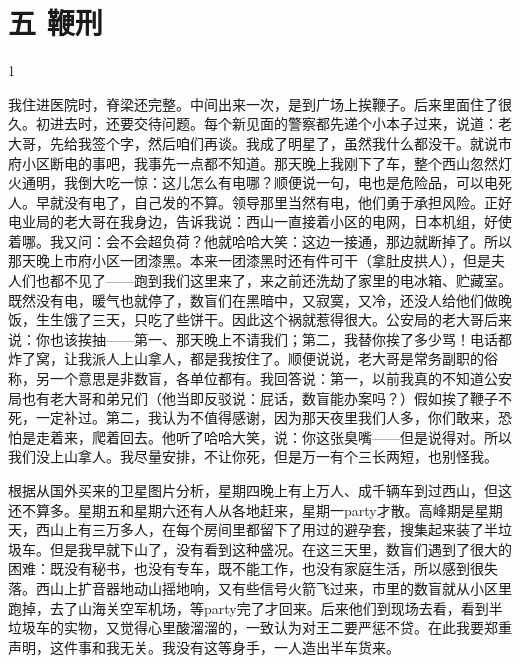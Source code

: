 \section{五 鞭刑}

1 

我住进医院时，脊梁还完整。中间出来一次，是到广场上挨鞭子。后来里面住了很久。初进去时，还要交待问题。每个新见面的警察都先递个小本子过来，说道：老大哥，先给我签个字，然后咱们再谈。我成了明星了，虽然我什么都没干。就说市府小区断电的事吧，我事先一点都不知道。那天晚上我刚下了车，整个西山忽然灯火通明，我倒大吃一惊：这儿怎么有电哪？顺便说一句，电也是危险品，可以电死人。早就没有电了，自己发的不算。领导那里当然有电，他们勇于承担风险。正好电业局的老大哥在我身边，告诉我说：西山一直接着小区的电网，日本机组，好使着哪。我又问：会不会超负荷？他就哈哈大笑：这边一接通，那边就断掉了。所以那天晚上市府小区一团漆黑。本来一团漆黑时还有件可干（拿肚皮拱人），但是夫人们也都不见了——跑到我们这里来了，来之前还洗劫了家里的电冰箱、贮藏室。既然没有电，暖气也就停了，数盲们在黑暗中，又寂寞，又冷，还没人给他们做晚饭，生生饿了三天，只吃了些饼干。因此这个祸就惹得很大。公安局的老大哥后来说：你也该挨抽——第一、那天晚上不请我们；第二，我替你挨了多少骂！电话都炸了窝，让我派人上山拿人，都是我按住了。顺便说说，老大哥是常务副职的俗称，另一个意思是非数盲，各单位都有。我回答说：第一，以前我真的不知道公安局也有老大哥和弟兄们（他当即反驳说：屁话，数盲能办案吗？）假如挨了鞭子不死，一定补过。第二，我认为不值得感谢，因为那天夜里我们人多，你们敢来，恐怕是走着来，爬着回去。他听了哈哈大笑，说：你这张臭嘴——但是说得对。所以我们没上山拿人。我尽量安排，不让你死，但是万一有个三长两短，也别怪我。 

根据从国外买来的卫星图片分析，星期四晚上有上万人、成千辆车到过西山，但这还不算多。星期五和星期六还有人从各地赶来，星期一party才散。高峰期是星期天，西山上有三万多人，在每个房间里都留下了用过的避孕套，搜集起来装了半垃圾车。但是我早就下山了，没有看到这种盛况。在这三天里，数盲们遇到了很大的困难：既没有秘书，也没有专车，既不能工作，也没有家庭生活，所以感到很失落。西山上扩音器地动山摇地响，又有些信号火箭飞过来，市里的数盲就从小区里跑掉，去了山海关空军机场，等party完了才回来。后来他们到现场去看，看到半垃圾车的实物，又觉得心里酸溜溜的，一致认为对王二要严惩不贷。在此我要郑重声明，这件事和我无关。我没有这等身手，一人造出半车货来。 

